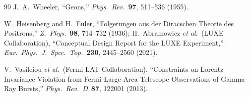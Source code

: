 \documentclass[11pt,a4paper]{article}
\begin{document}
\begin{thebibliography}{99}
J.~A.~Wheeler, ``Geons,'' \emph{Phys.\ Rev.}\ \textbf{97}, 511--536 (1955).

W.~Heisenberg and H.~Euler, ``Folgerungen aus der Diracschen Theorie des Positrons,'' \emph{Z.\ Phys.}\ \textbf{98}, 714--732 (1936); H.~Abramowicz \emph{et al.}\ (LUXE Collaboration), ``Conceptual Design Report for the LUXE Experiment,'' \emph{Eur.\ Phys.\ J.\ Spec.\ Top.}\ \textbf{230}, 2445--2560 (2021).

V.~Vasileiou \emph{et al.}\ (Fermi-LAT Collaboration), ``Constraints on Lorentz Invariance Violation from Fermi-Large Area Telescope Observations of Gamma-Ray Bursts,'' \emph{Phys.\ Rev.\ D}\ \textbf{87}, 122001 (2013).

\end{thebibliography}
\end{document}
